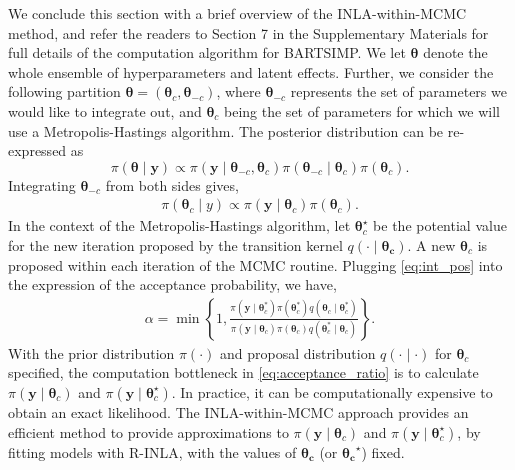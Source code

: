 \documentclass[preprint,12pt,authoryear]{elsarticle}
\begin{document}
{

{We conclude this section with a brief overview of the INLA-within-MCMC method, and refer the readers to Section 7 in the Supplementary Materials for full details of the computation algorithm for BARTSIMP.} We let $\boldsymbol{\theta}$ denote the whole ensemble of hyperparameters and latent effects. Further, we consider the following partition $\boldsymbol{\theta} = \left(\boldsymbol{\theta}_{c}, \boldsymbol{\theta}_{-c}\right)$, where $\boldsymbol{\theta}_{-c}$ represents the set of parameters we would like to integrate out, and $\boldsymbol{\theta}_{c}$ being the set of parameters for which we will use a Metropolis-Hastings algorithm. 
The posterior distribution can be re-expressed as 
$$
\pi(\boldsymbol{\theta} \mid \boldsymbol{y}) \propto \pi\left(\boldsymbol{y} \mid \boldsymbol{\theta}_{-c}, \boldsymbol{\theta}_{c}\right) \pi\left(\boldsymbol{\theta}_{-c} \mid \boldsymbol{\theta}_{c}\right) \pi\left(\boldsymbol{\theta}_{c}\right) .
$$
Integrating $\boldsymbol{\theta}_{-c}$ from both sides gives,
\begin{align}
\label{eq:int_pos}
  \pi\left(\boldsymbol{\theta}_{c} \mid y\right) \propto \pi\left(\boldsymbol{y} \mid \boldsymbol{\theta}_{c}\right) \pi\left(\boldsymbol{\theta}_{c}\right).  
\end{align}
In the context of the Metropolis-Hastings algorithm, let $\boldsymbol{\theta}_c^{\star}$ be the potential value for the new iteration proposed by the transition kernel $q\left(\cdot\mid \boldsymbol{\theta_c}\right)$. A new $\boldsymbol{\theta}_c$ is proposed within each iteration of the MCMC routine. Plugging \eqref{eq:int_pos} into the expression of the acceptance probability, we have, %
\begin{align}
\label{eq:acceptance_ratio}
\alpha=\min \left\{1, \frac{\pi\left(\boldsymbol{y} \mid \boldsymbol{\theta}_{c}^{*}\right) \pi\left(\boldsymbol{\theta}_{c}^{*}\right) q\left(\boldsymbol{\theta}_{c} \mid \boldsymbol{\theta}_{c}^{*}\right)}{\pi\left(\boldsymbol{y} \mid \boldsymbol{\theta}_{c}\right) \pi\left(\boldsymbol{\theta}_{c}\right) q\left(\boldsymbol{\theta}_{c}^{*} \mid \boldsymbol{\theta}_{c}\right)}\right\}.
\end{align}
With the prior distribution $\pi(\cdot)$ 
and proposal distribution $q(\cdot \mid \cdot)$ for $\boldsymbol{\theta}_c$ specified, the computation bottleneck in \eqref{eq:acceptance_ratio} is to calculate $\pi\left(\boldsymbol{y} \mid \boldsymbol{\theta}_{c}\right)$ and $\pi\left(\boldsymbol{y} \mid \boldsymbol{\theta}_{c}^{\star}\right)$. In practice, it can be computationally expensive to obtain an exact likelihood. The INLA-within-MCMC approach provides an efficient method to provide approximations to $\pi\left(\boldsymbol{y} \mid \boldsymbol{\theta}_{c}\right)$ and $\pi\left(\boldsymbol{y} \mid \boldsymbol{\theta}_{c}^{\star}\right)$, by fitting models with R-INLA, with the values of $\boldsymbol{\theta_c}$ (or $\boldsymbol{\theta_c}^{\star}$) fixed. 
}
\end{document}
